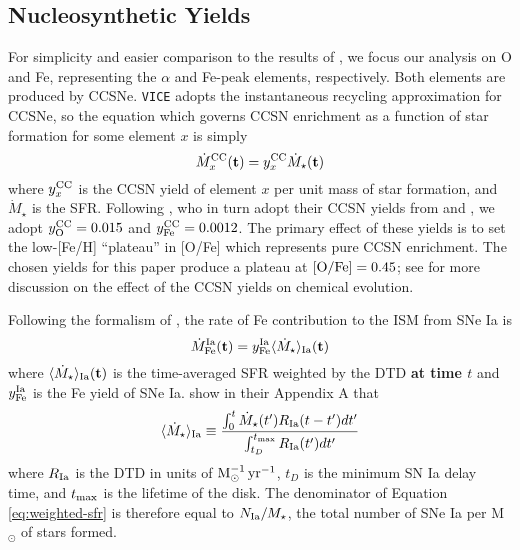 \documentclass[twocolumn,twocolappendix,linenumbers]{aastex631}
\newcommand{\vice}{{\tt VICE}\xspace}
\begin{document}
\subsection{Nucleosynthetic Yields}
\label{sec:yields}

For simplicity and easier comparison to the results of , we focus our analysis on O and Fe, representing the $\alpha$ and Fe-peak elements, respectively. Both elements are produced by CCSNe. \vice adopts the instantaneous recycling approximation for CCSNe, so the equation which governs CCSN enrichment as a function of star formation for some element $x$ is simply
\begin{equation}
    \dot M_x^{\rm CC}{\bf (t)} = y_x^{\rm CC} \dot M_\star{\bf (t)}
    \label{eq:ccsn-enrichment}
\end{equation}
where $y_x^{\rm CC}$ is the CCSN yield of element $x$ per unit mass of star formation, and $\dot M_\star$ is the SFR. Following , who in turn adopt their CCSN yields from \citet{ChieffiLimongi2004-CCSNYields} and \citet{LimongiChieffi2006-CCSNYields}, we adopt $y_{\rm O}^{\rm CC}=0.015$ and $y_{\rm Fe}^{\rm CC}=0.0012$. The primary effect of these yields is to set the low-[Fe/H] ``plateau'' in [O/Fe] which represents pure CCSN enrichment. The chosen yields for this paper produce a plateau at ${\rm [O/Fe]}=0.45$; see \citet{Weinberg2023-CCSNYield} for more discussion on the effect of the CCSN yields on chemical evolution.

Following the formalism of \citet{Weinberg2017-ChemicalEquilibrium}, the rate of Fe contribution to the ISM from SNe Ia is 
\begin{equation}
    \dot M_{\rm Fe}^{\rm Ia}{\bf (t)} = y_{\rm Fe}^{\rm Ia} \langle \dot M_\star\rangle_{\rm Ia} {\bf (t)}\\
\end{equation}
where $\langle \dot M_\star\rangle_{\rm Ia}{\bf (t)}$ is the time-averaged SFR weighted by the DTD {\bf at time $t$} and $y_{\rm Fe}^{\rm Ia}$ is the Fe yield of SNe Ia. \citet{Weinberg2017-ChemicalEquilibrium} show in their Appendix A that
\begin{equation}
    \langle \dot M_\star\rangle_{\rm Ia} \equiv \frac{\int_0^t \dot M_\star(t')R_{\rm Ia}(t-t')dt'}{\int_{t_D}^{t_{\rm max}} R_{\rm Ia}(t')dt'}
    \label{eq:weighted-sfr}
\end{equation}
where $R_{\rm Ia}$ is the DTD in units of ${\rm M}_\odot^{-1}\,{\rm yr}^{-1}$, $t_D$ is the minimum SN Ia delay time, and $t_{\rm max}$ is the lifetime of the disk. The denominator of Equation \ref{eq:weighted-sfr} is therefore equal to $N_{\rm Ia}/M_\star$, the total number of SNe Ia per M$_{\odot}$ of stars formed.
\end{document}
